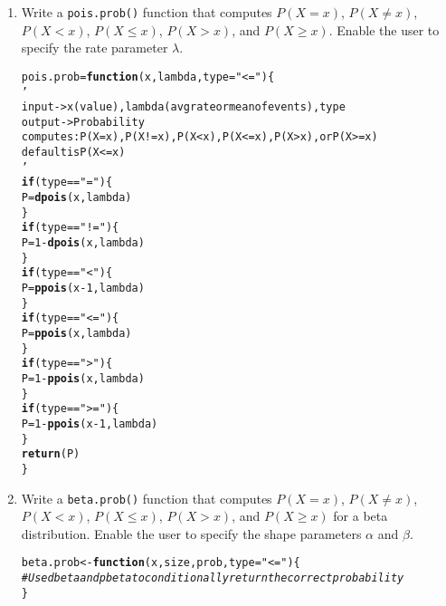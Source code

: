 \documentclass{article}\usepackage[]{graphicx}\usepackage[]{xcolor}
\makeatletter
\newcommand{\hlnum}[1]{\textcolor[rgb]{0.686,0.059,0.569}{#1}}%
\newcommand{\hlsng}[1]{\textcolor[rgb]{0.192,0.494,0.8}{#1}}%
\newcommand{\hlcom}[1]{\textcolor[rgb]{0.678,0.584,0.686}{\textit{#1}}}%
\newcommand{\hlopt}[1]{\textcolor[rgb]{0,0,0}{#1}}%
\newcommand{\hldef}[1]{\textcolor[rgb]{0.345,0.345,0.345}{#1}}%
\newcommand{\hlkwa}[1]{\textcolor[rgb]{0.161,0.373,0.58}{\textbf{#1}}}%
\newcommand{\hlkwb}[1]{\textcolor[rgb]{0.69,0.353,0.396}{#1}}%
\newcommand{\hlkwc}[1]{\textcolor[rgb]{0.333,0.667,0.333}{#1}}%
\newcommand{\hlkwd}[1]{\textcolor[rgb]{0.737,0.353,0.396}{\textbf{#1}}}%
\newenvironment{kframe}{%
 \def\at@end@of@kframe{}%
 \ifinner\ifhmode%
  \def\at@end@of@kframe{\end{minipage}}%
  \begin{minipage}{\columnwidth}%
 \fi\fi%
 \def\FrameCommand##1{\hskip\@totalleftmargin \hskip-\fboxsep
 \colorbox{shadecolor}{##1}\hskip-\fboxsep
     \hskip-\linewidth \hskip-\@totalleftmargin \hskip\columnwidth}%
 \MakeFramed {\advance\hsize-\width
   \@totalleftmargin\z@ \linewidth\hsize
   \@setminipage}}%
 {\par\unskip\endMakeFramed%
 \at@end@of@kframe}
\newenvironment{knitrout}{}{} %
\makeatother
\begin{document}
  \begin{enumerate}
    \item Write a \texttt{pois.prob()} function that computes $P(X=x)$, 
    $P(X \neq x)$, $P(X<x)$, $P(X \leq x)$, $P(X > x)$, and $P(X \geq x).$ Enable the user to specify the rate parameter $\lambda$.
\begin{knitrout}\scriptsize
{}\color{fgcolor}\begin{kframe}
\begin{alltt}
\hldef{pois.prob} \hlkwb{=} \hlkwa{function}\hldef{(}\hlkwc{x}\hldef{,} \hlkwc{lambda}\hldef{,} \hlkwc{type} \hldef{=} \hlsng{"<="}\hldef{)\{}
  \hlsng{'
  input -> x (value), lambda (avg rate or mean of events), type
  output -> Probability
  computes: P(X=x), P(X!=x), P(X<x), P(X<=x), P(X>x), or P(X>=x)
  default is P(X<=x)
  '}
  \hlkwa{if} \hldef{(type} \hlopt{==} \hlsng{"="}\hldef{)\{}
    \hldef{P} \hlkwb{=} \hlkwd{dpois}\hldef{(x, lambda)}
  \hldef{\}}
  \hlkwa{if} \hldef{(type} \hlopt{==} \hlsng{"!="}\hldef{)\{}
    \hldef{P} \hlkwb{=} \hlnum{1} \hlopt{-} \hlkwd{dpois}\hldef{(x, lambda)}
  \hldef{\}}
  \hlkwa{if} \hldef{(type} \hlopt{==} \hlsng{"<"}\hldef{)\{}
    \hldef{P} \hlkwb{=} \hlkwd{ppois}\hldef{(x}\hlopt{-}\hlnum{1}\hldef{, lambda)}
  \hldef{\}}
  \hlkwa{if} \hldef{(type} \hlopt{==}  \hlsng{"<="}\hldef{)\{}
    \hldef{P} \hlkwb{=} \hlkwd{ppois}\hldef{(x, lambda)}
  \hldef{\}}
  \hlkwa{if} \hldef{(type} \hlopt{==} \hlsng{">"}\hldef{)\{}
    \hldef{P} \hlkwb{=} \hlnum{1} \hlopt{-} \hlkwd{ppois}\hldef{(x, lambda)}
  \hldef{\}}
  \hlkwa{if} \hldef{(type} \hlopt{==} \hlsng{">="}\hldef{)\{}
    \hldef{P} \hlkwb{=} \hlnum{1} \hlopt{-} \hlkwd{ppois}\hldef{(x}\hlopt{-}\hlnum{1}\hldef{, lambda)}
  \hldef{\}}
  \hlkwd{return}\hldef{(P)}
\hldef{\}}
\end{alltt}
\end{kframe}
\end{knitrout}
    \item Write a \texttt{beta.prob()} function that computes $P(X=x)$, 
    $P(X \neq x)$, $P(X<x)$, $P(X \leq x)$, $P(X > x)$, and $P(X \geq x)$
    for a beta distribution. Enable the user to specify the shape parameters
    $\alpha$ and $\beta$.
\begin{knitrout}\scriptsize
{}\color{fgcolor}\begin{kframe}
\begin{alltt}
\hldef{beta.prob} \hlkwb{<-} \hlkwa{function}\hldef{(}\hlkwc{x}\hldef{,} \hlkwc{size}\hldef{,} \hlkwc{prob}\hldef{,} \hlkwc{type}\hldef{=}\hlsng{"<="}\hldef{)\{}
  \hlcom{# Use dbeta and pbeta to conditionally return the correct probability}
\hldef{\}}
\end{alltt}
\end{kframe}
\end{knitrout}
\end{enumerate}

\end{document}
